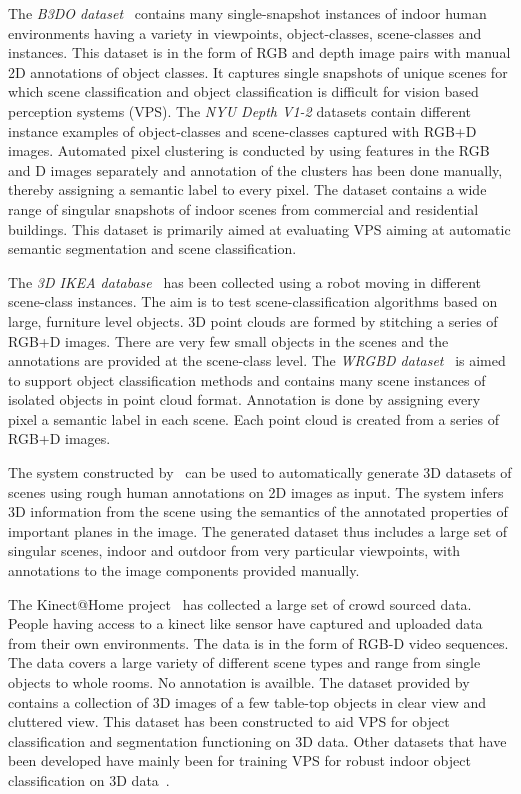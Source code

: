 \documentclass[letterpaper, 10 pt, conference]{ieeeconf}  %
\begin{document}
The \textit{B3DO dataset}~\cite{Janoch:ICCV2011} contains many
single-snapshot instances of indoor human environments having a
variety in viewpoints, object-classes, scene-classes and
instances. This dataset is in the form of RGB and depth image pairs
with manual 2D annotations of object classes. It captures single
snapshots of unique scenes for which scene classification and object
classification is difficult for vision based perception systems (VPS).
The \textit{NYU Depth V1-2}\cite{Silberman:ECCV2012} datasets contain
different instance examples of object-classes and scene-classes
captured with RGB+D images. Automated pixel clustering is conducted by
using features in the RGB and D images separately and annotation of
the clusters has been done manually, thereby assigning a semantic
label to every pixel. The dataset contains a wide range of singular
snapshots of indoor scenes from commercial and residential
buildings. This dataset is primarily aimed at evaluating VPS aiming at
automatic semantic segmentation and scene classification.

The \textit{3D IKEA database}~\cite{Swadzba:RAS2012} has been collected using a robot moving in different scene-class instances. The 
aim is to test scene-classification algorithms based on large, furniture level objects. 3D point clouds are formed by 
stitching a series of RGB+D images. There are very few small objects in the scenes and the annotations are provided at the 
scene-class level. The \textit{WRGBD dataset}~\cite{Lai:ICRA2011} is aimed to support object classification methods and contains many scene 
instances of isolated objects in point cloud format. Annotation is done by assigning every pixel a semantic label in each scene. Each point 
cloud is created from a series of RGB+D images.

The system constructed by~\cite{Russell:CVPR2009} can be used to automatically generate 3D datasets of scenes using rough human annotations 
on 2D images as input. The system infers 3D information from the scene using the semantics of the annotated properties of important planes 
in the image. The generated dataset thus includes a large set of singular scenes, indoor and outdoor from very particular viewpoints, with 
annotations to the image components provided manually.

The Kinect@Home project~\cite{Goransson13a} has collected a large set of crowd sourced data. People having access to a kinect like sensor 
have captured and uploaded data from their own environments. The data is in the form of RGB-D video sequences. The data covers a large 
variety of different scene types and range from single objects to whole rooms. No annotation is availble.
The dataset provided by~\cite{Sun:ECCV2010} contains a collection of 3D images of a few table-top objects in clear view and cluttered view. 
This dataset has been constructed to aid VPS for object classification and segmentation functioning on 3D data. Other datasets that have 
been developed have mainly been for training VPS for robust indoor object classification on 3D data~\cite{WillowGarage:2011,Kimmel:ACCV2010}.
\end{document}
